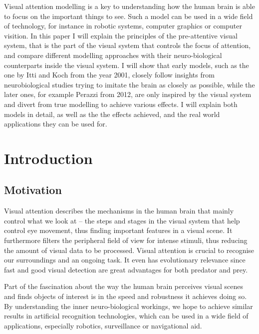 \documentclass[a4paper,12pt,fleqn,oneside]{scrartcl}
\begin{document}
\begin{titlepage}
\begin{minipage}{0.8\textwidth}
{        Visual attention modelling is a key to understanding how the human brain
        is able to focus on the important things to see. Such a model can be
        used in a wide field of technology, for instance in robotic systems,
        computer graphics or computer visition. In this paper I will explain the
        principles of the pre-attentive visual system, that is the part of the
        visual system that controls the focus of attention, and compare
        different modelling approaches with their neuro-biological counterparts
        inside the visual system. I will show that early models, such as the one
        by Itti and Koch from the year 2001, closely follow insights from
        neurobiological studies trying to imitate the brain as closely as
        possible, while the later ones, for example Perazzi from 2012, are only
        inspired by the visual system and divert from true modelling to achieve
        various effects. I will explain both models in detail, as well as the
        the effects achieved, and the real world applications they can be used
        for.

    }
    \end{minipage}

\end{titlepage}

\tableofcontents

\newpage
\section{Introduction}

\subsection{Motivation}

Visual attention describes the mechanisms in the human brain that mainly control
what we look at -- the steps and stages in the visual system that help control
eye movement, thus finding important features in a visual scene. It furthermore
filters the peripheral field of view for intense stimuli, thus reducing the
amount of visual data to be processed. Visual attention is crucial to recognise
our surroundings and an ongoing task. It even has evolutionary relevance since
fast and good visual detection are great advantages for both predator and prey.

Part of the fascination about the way the human brain perceives visual scenes and finds objects of interest is in the
speed and robustness it achieves doing so. By understanding the inner neuro-biological workings, we hope to achieve similar
results in artificial recognition technologies, which can be used in a wide field of applications, especially robotics,
surveillance or navigational aid.
\end{document}
